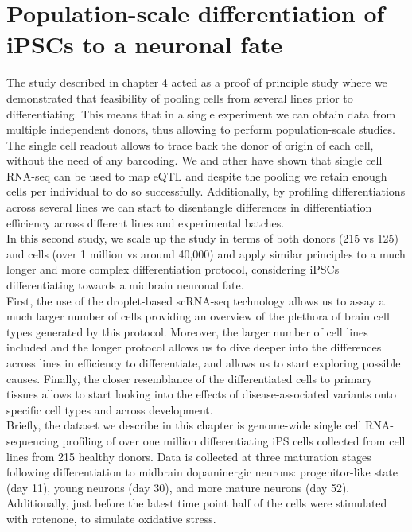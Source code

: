 
\chapter{Population-scale differentiation of iPSCs to a neuronal fate}
\label{chapter5}

The study described in chapter 4 acted as a proof of principle study where we demonstrated that feasibility of pooling cells from several lines prior to differentiating.
This means that in a single experiment we can obtain data from multiple independent donors, thus allowing to perform population-scale studies.
The single cell readout allows to trace back the donor of origin of each cell, without the need of any barcoding.
We and other have shown that single cell RNA-seq can be used to map eQTL and despite the pooling we retain enough cells per individual to do so successfully.
Additionally, by profiling differentiations across several lines we can start to disentangle differences in differentiation efficiency across different lines and experimental batches.\\

In this second study, we scale up the study in terms of both donors (215 vs 125) and cells (over 1 million vs around 40,000) and apply similar principles to a much longer and more complex differentiation protocol, considering iPSCs differentiating towards a midbrain neuronal fate.\\

First, the use of the droplet-based scRNA-seq technology allows us to assay a much larger number of cells providing an overview of the plethora of brain cell types generated by this protocol. 
Moreover, the larger number of cell lines included and the longer protocol allows us to dive deeper into the differences across lines in efficiency to differentiate, and allows us to start exploring possible causes.
Finally, the closer resemblance of the differentiated cells to primary tissues allows to start looking into the effects of disease-associated variants onto specific cell types and across development. \\

Briefly, the dataset we describe in this chapter is genome-wide single cell RNA-sequencing profiling of over one million differentiating iPS cells collected from cell lines from 215 healthy donors. 
Data is collected at three maturation stages following differentiation to midbrain dopaminergic neurons: progenitor-like state (day 11), young neurons (day 30), and more mature neurons (day 52). 
Additionally, just before the latest time point half of the cells were stimulated with rotenone, to simulate oxidative stress. 

